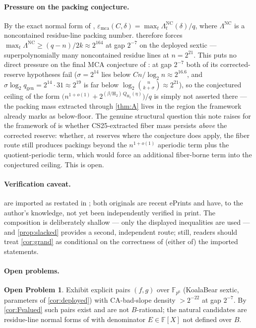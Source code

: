 \documentclass[11pt]{article}
\theoremstyle{definition}
\newtheorem{problem}[theorem]{Open Problem}
\theoremstyle{remark}
\newcommand{\F}{\mathbb{F}}
\newcommand{\B}{B}
\newcommand{\emca}{\varepsilon_{\mathrm{mca}}}
\newcommand{\Hb}{\mathrm{H}_2}
\begin{document}
\paragraph{Pressure on the packing conjecture.}
By the exact normal form of \cite{Cho26b}, $\emca(C,\delta)=\max_t\Lambda^{\mathrm{NC}}_t(\delta)/q$, where $\Lambda^{\mathrm{NC}}$ is a noncontained residue-line packing number.  therefore forces $\max_t\Lambda^{\mathrm{NC}}\ge(q-n)/2k\approx2^{164}$ at gap $2^{-7}$ on the deployed sextic --- superpolynomially many noncontained residue lines at $n=2^{21}$. This puts no direct pressure on the final MCA conjecture of \cite[Conj.\ ``Final floor- and quotient-corrected MCA asymptotic'']{Cho26b}: at gap $2^{-7}$ both of its corrected-reserve hypotheses fail ($\sigma=2^{14}$ lies below $Cn/\log_2n\approx2^{16.6}$, and $\sigma\log_2 q_{\mathrm{gen}}=2^{14}\cdot31\approx2^{19}$ is far below $\log_2\binom n{k+\sigma}\approx2^{21}$), so the conjectured ceiling of the form $\bigl(n^{1+o(1)}+2^{(\beta/\Hb)\,Q_{\Hb}(\eta)}\bigr)/q$ is simply not asserted there --- the packing mass extracted through \cref{thm:A} lives in the region the framework already marks as below-floor. The genuine structural question this note raises for the framework of \cite{Cho26b} is whether CS25-extracted fiber mass persists \emph{above} the corrected reserve: whether, at reserves where the conjecture does apply, the fiber route still produces packings beyond the $n^{1+o(1)}$ aperiodic term plus the quotient-periodic term, which would force an additional fiber-borne term into the conjectured ceiling. This is open.

\paragraph{Verification caveat.}
 are imported as restated in \cite{ABF26}; both originals are recent ePrints and have, to the author's knowledge, not yet been independently verified in print. The composition is deliberately shallow --- only the displayed inequalities are used --- and \cref{prop:slacked} provides a second, independent route; still, readers should treat \cref{cor:grand} as conditional on the correctness of (either of) the imported statements.

\paragraph{Open problems.}

\begin{problem}\label{prob:explicit}
Exhibit explicit pairs $(f,g)$ over $\F_{p^6}$ (KoalaBear sextic, parameters of \cref{cor:deployed}) with CA-bad-slope density $>2^{-22}$ at gap $2^{-7}$. By \cref{cor:Fvalued} such pairs exist and are not $\B$-rational; the natural candidates are residue-line normal forms of \cite{Cho26b} with denominator $E\in\F[X]$ not defined over $\B$.
\end{problem}
\end{document}
